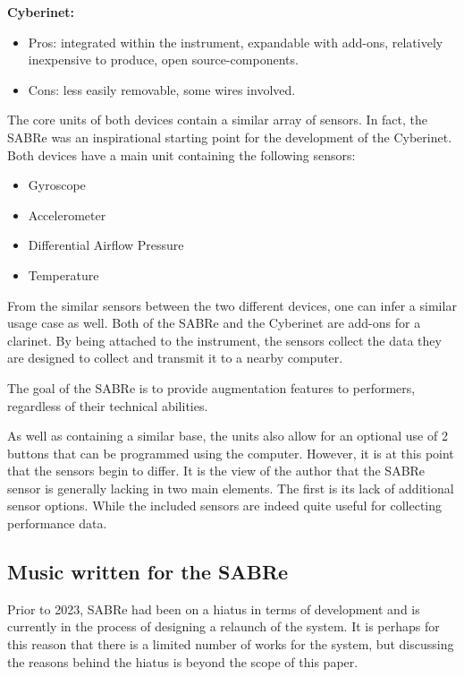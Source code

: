 \textbf{Cyberinet:} 

\begin{itemize}
    \item Pros: integrated within the instrument, expandable with add-ons, relatively inexpensive to produce, open source-components.
    \item Cons: less easily removable, some wires involved.
\end{itemize}

The core units of both devices contain a similar array of sensors. In fact, the SABRe was an inspirational starting point for the development of the Cyberinet. Both devices have a main unit containing the following sensors:

\begin{itemize}
    \item Gyroscope
    \item Accelerometer 
    \item Differential Airflow Pressure
    \item Temperature
\end{itemize}

From the similar sensors between the two different devices, one can infer a similar usage case as well. Both of the SABRe and the Cyberinet are add-ons for a clarinet. By being attached to the instrument, the sensors collect the data they are designed to collect and transmit it to a nearby computer.

The goal of the SABRe is to provide augmentation features to performers, regardless of their technical abilities\cite{Schiesser2012}.

As well as containing a similar base, the units also allow for an optional use of 2 buttons that can be programmed using the computer. However, it is at this point that the sensors begin to differ. It is the view of the author that the SABRe sensor is generally lacking in two main elements. The first is its lack of additional sensor options. While the included sensors are indeed quite useful for collecting performance data.

\subsection{Music written for the SABRe}

Prior to 2023, SABRe had been on a hiatus in terms of development and is currently in the process of designing a relaunch of the system. It is perhaps for this reason that there is a limited number of works for the system, but discussing the reasons behind the hiatus is beyond the scope of this paper.

